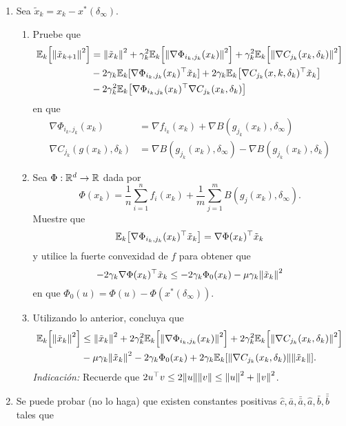 \documentclass{article}
\begin{document}
\begin{enumerate}
	\item Sea \(\tilde{x}_k = x_k - x^*(\delta_\infty)\).
	\begin{enumerate}
		\item Pruebe que
		\begin{align*}
			\mathbb{E}_k\qty[\norm{\tilde{x}_{k+1}}^2] &= \norm{\tilde{x}_k}^2 + \gamma_k^2 \mathbb{E}_k \qty[\norm{\nabla \Phi_{i_k, j_k} (x_k)}^2] + \gamma_k^2 \mathbb{E}_k \qty[\norm{\nabla C_{j_k} (x_k, \delta_k)}^2] \\
			&- 2 \gamma_k \mathbb{E}_k  [\nabla \Phi_{i_k, j_k}(x_k)^\top \tilde{x}_k] + 2 \gamma_k \mathbb{E}_k \qty[ \nabla C_{j_k} (x, k, \delta_k)^\top \tilde{x}_k ] \\
			&- 2\gamma_k^2 \mathbb{E}_k \qty[ \nabla \Phi_{i_k, j_k}(x_k) ^\top \nabla C_{j_k} (x_k, \delta_k)]
		\end{align*}
		en que
		\begin{align*}
			\nabla \Phi_{i_k, j_k} (x_k) &= \nabla f_{i_k} (x_k) + \nabla B (g_{j_k}(x_k), \delta_\infty) \\
			\nabla C_{j_k} (g(x_k), \delta_k) &= \nabla B(g_{j_k}(x_k), \delta_\infty) - \nabla B (g_{j_k}(x_k), \delta_k)
		\end{align*}
		\item Sea \(\Phi: \mathbb{R}^d \to \mathbb{R}\) dada por
		\[\Phi(x_k) = \frac{1}{n} \sum_{i=1}^n f_i(x_k) + \frac{1}{m} \sum_{j=1}^m B( g_j(x_k), \delta_\infty).\]
		Muestre que
		\[\mathbb{E}_k \qty[ \nabla \Phi_{i_k, j_k}(x_k)^\top \tilde{x}_k] = \nabla \Phi(x_k)^\top \tilde{x}_k\]
		y utilice la fuerte convexidad de \(f\) para obtener que
		\[-2\gamma_k \nabla \Phi(x_k)^\top \tilde{x}_k \leq -2 \gamma_k \Phi_0(x_k) - \mu \gamma_k \norm{\tilde{x}_k}^2\]
		en que \(\Phi_0(u) = \Phi(u) - \Phi(x^*(\delta_\infty))\).
		\item Utilizando lo anterior, concluya que
		\begin{align*}
			\mathbb{E}_k \qty[\norm{\tilde{x}_k}^2] &\leq \norm{\tilde{x}_k}^2 + 2 \gamma_k^2 \mathbb{E}_k \qty[\norm{\nabla \Phi_{i_k, j_k}(x_k)}^2] + 2 \gamma_k^2 \mathbb{E}_k \qty[\norm{\nabla C_{j_k}(x_k, \delta_k)}^2]\\
			&- \mu \gamma_k \norm{\tilde{x}_k}^2  - 2 \gamma_k \Phi_0(x_k) + 2 \gamma_k \mathbb{E}_k \qty[\norm{\nabla C_{j_k}(x_k, \delta_k)} \norm{\tilde{x}_k}].
		\end{align*}
		\textit{Indicación:} Recuerde que \(2 u^\top v \leq 2 \norm{u} \norm{v} \leq \norm{u}^2 + \norm{v}^2\).
	\end{enumerate}
	\item Se puede probar (no lo haga) que existen constantes positivas \(\hat{c}, \bar{a}, \bar{\bar{a}}, \hat{a}, \bar{b}, \bar{\bar{b}}\) tales que

\end{enumerate}
\end{document}
